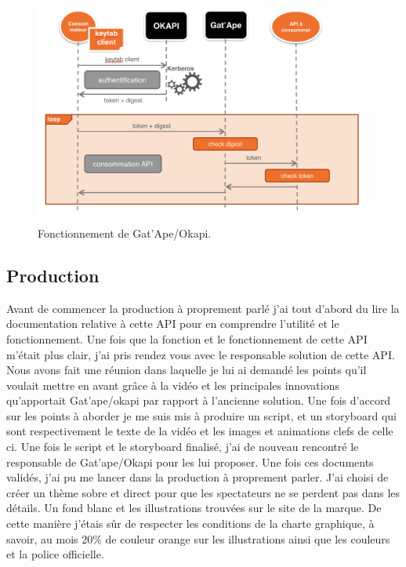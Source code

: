 \begin{figure}[htp]
  \centering
  \includegraphics[width=15cm]{images/gao/gao1}
  \caption{Fonctionnement de Gat'Ape/Okapi.}
  \label{fig:une-autre-image}
\end{figure}



\subsection{Production}
Avant de commencer la production à proprement parlé j'ai tout d'abord du lire la documentation relative à cette API pour en comprendre l'utilité et le fonctionnement. Une fois que la fonction et le fonctionnement de cette API m'était plus clair, j'ai pris rendez vous avec le responsable solution de cette API. Nous avons fait une réunion dans laquelle je lui ai demandé les points qu'il voulait mettre en avant grâce à la vidéo et les principales innovations qu'apportait Gat'ape/okapi par rapport à l'ancienne solution. Une fois d'accord sur les points à aborder je me suis mis à produire un script, et un storyboard qui sont respectivement le texte de la vidéo et les images et animations clefs de celle ci. Une fois le script et le storyboard finalisé, j'ai de nouveau rencontré le responsable de Gat'ape/Okapi pour les lui proposer. Une fois ces documents validés, j'ai pu me lancer dans la production à proprement parler. J'ai choisi de créer un thème sobre et direct pour que les spectateurs ne se perdent pas dans les détails. Un fond blanc et les illustrations trouvées sur le site de la marque. De cette manière j'étais sûr de respecter les conditions de la charte graphique, à savoir, au mois 20\% de couleur orange sur les illustrations ainsi que les couleurs et la police officielle.\\


